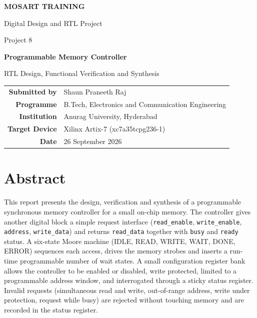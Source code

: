 \documentclass[11pt,a4paper]{article}
\newcommand{\sig}[1]{\texttt{#1}}
\begin{document}
\begin{titlepage}
\centering
\vspace*{1.2cm}
{\Large\bfseries MOSART TRAINING\par}
\vspace{0.3cm}
{\large Digital Design and RTL Project\par}
\vspace{2.2cm}
{\large Project 8\par}
\vspace{0.3cm}
{\LARGE\bfseries Programmable Memory Controller\par}
\vspace{0.5cm}
{\large RTL Design, Functional Verification and Synthesis\par}
\vspace{2.5cm}
\begin{tabular}{rl}
\textbf{Submitted by} & Shaun Praneeth Raj \\
\textbf{Programme} & B.Tech, Electronics and Communication Engineering \\
\textbf{Institution} & Anurag University, Hyderabad \\
\textbf{Target Device} & Xilinx Artix-7 (xc7a35tcpg236-1) \\
\textbf{Date} & 26 September 2026 \\
\end{tabular}
\vfill

\end{titlepage}

\section*{Abstract}
This report presents the design, verification and synthesis of a programmable synchronous memory controller for a small on-chip memory. The controller gives another digital block a simple request interface (\sig{read\_enable}, \sig{write\_enable}, \sig{address}, \sig{write\_data}) and returns \sig{read\_data} together with \sig{busy} and \sig{ready} status. A six-state Moore machine (IDLE, READ, WRITE, WAIT, DONE, ERROR) sequences each access, drives the memory strobes and inserts a run-time programmable number of wait states. A small configuration register bank allows the controller to be enabled or disabled, write protected, limited to a programmable address window, and interrogated through a sticky status register. Invalid requests (simultaneous read and write, out-of-range address, write under protection, request while busy) are rejected without touching memory and are recorded in the status register.
\end{document}
